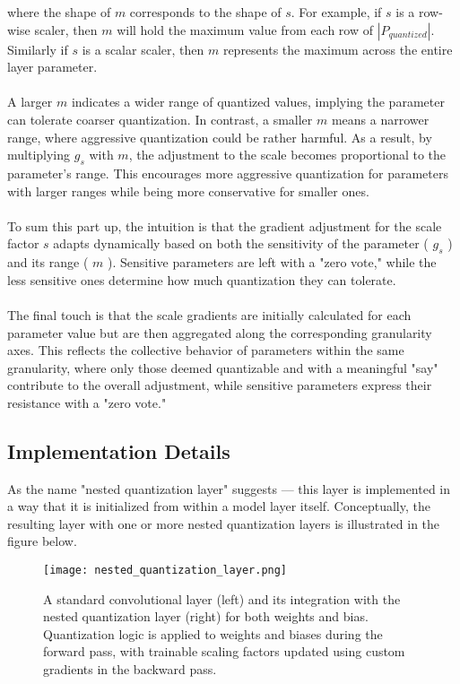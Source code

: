 \noindent where the shape of \( m \) corresponds to the shape of \( s \).
For example, if \( s \) is a row-wise scaler, then \( m  \) will hold
the maximum value from each row of \( \left| P_{quantized} \right|\).
Similarly if  \( s \) is a scalar scaler, then \( m \) represents
the maximum across the entire layer parameter.
\\
\\
A larger \( m \) indicates a wider range of quantized values,
implying the parameter can tolerate coarser quantization.
In contrast, a smaller \( m \) means a narrower range,
where aggressive quantization could be rather harmful.
As a result, by multiplying \( g_s\) with \( m \), 
the adjustment to the scale becomes proportional to the parameter's range.
This encourages more aggressive quantization for parameters with larger ranges
while being more conservative for smaller ones.
\\
\\
To sum this part up, the intuition is that the gradient adjustment for the scale factor
\( s \) adapts dynamically based on both the sensitivity of the parameter ( \( g_s\) )
and its range ( \( m \) ). Sensitive parameters are left with a "zero vote,"
while the less sensitive ones determine how much quantization they can tolerate.
\\
\\
The final touch is that the scale gradients are initially calculated for each parameter value
but are then aggregated along the corresponding granularity axes.
This reflects the collective behavior of parameters within the same granularity,
where only those deemed quantizable and with a meaningful "say" contribute to the overall adjustment,
while sensitive parameters express their resistance with a "zero vote."


\subsection{Implementation Details}
\label{subsec:quantizedconvolutional}

As the name "nested quantization layer" suggests —
this layer is implemented in a way that it is initialized from within a model layer itself.
Conceptually, the resulting layer with one or more nested quantization layers is illustrated in the figure below.

\begin{figure}[h!]
  \centering
  \texttt{[image: nested\_quantization\_layer.png]}
  \caption{A standard convolutional layer (left) and its integration with the nested quantization layer (right) for both weights and bias.
  Quantization logic is applied to weights and biases during the forward pass, with trainable scaling factors 
  updated using custom gradients in the backward pass.}
  \label{fig:dense_layer}
\end{figure}


